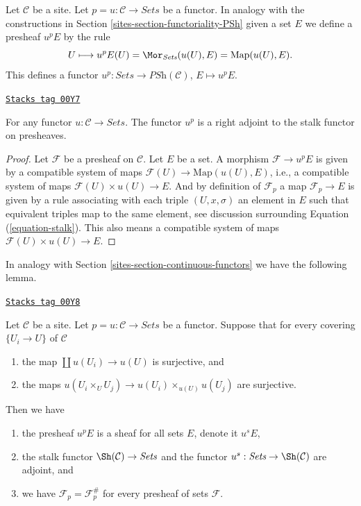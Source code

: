 Let $\mathcal{C}$ be a site. Let $p = u : \mathcal{C} \to \textit{Sets}$
be a functor. In analogy with the constructions in
Section \ref{sites-section-functoriality-PSh}
given a set $E$ we define a presheaf $u^pE$ by the rule
\begin{equation}
\label{equation-skyscraper}
U
\longmapsto
u^pE(U) = \Mor_{\textit{Sets}}(u(U), E) = \text{Map}(u(U), E).
\end{equation}
This defines a functor
$u^p : \textit{Sets} \to \textit{PSh}(\mathcal{C})$, $E \mapsto u^pE$.

\begin{lemma}
\label{sites-lemma-adjoint-point-push-stalk}
\href{https://stacks.math.columbia.edu/tag/00Y7}{\texttt{Stacks tag 00Y7}}

For any functor $u : \mathcal{C} \to \textit{Sets}$.
The functor $u^p$ is a right adjoint to the stalk functor
on presheaves.
\end{lemma}

\begin{proof}
Let $\mathcal{F}$ be a presheaf on $\mathcal{C}$.
Let $E$ be a set. A morphism $\mathcal{F} \to u^pE$
is given by a compatible system of maps
$\mathcal{F}(U) \to \text{Map}(u(U), E)$, i.e.,
a compatible system of maps $\mathcal{F}(U) \times u(U) \to E$.
And by definition of $\mathcal{F}_p$ a map $\mathcal{F}_p \to E$
is given by a rule associating with each triple $(U, x, \sigma)$
an element in $E$ such that equivalent triples map to the same element, see
discussion surrounding
Equation (\ref{equation-stalk}).
This also means a compatible system of maps $\mathcal{F}(U) \times u(U) \to E$.
\end{proof}

In analogy with Section \ref{sites-section-continuous-functors}
we have the following lemma.

\begin{lemma}
\label{sites-lemma-point-pushforward-sheaf}
\href{https://stacks.math.columbia.edu/tag/00Y8}{\texttt{Stacks tag 00Y8}}

Let $\mathcal{C}$ be a site. Let $p = u : \mathcal{C} \to \textit{Sets}$
be a functor. Suppose that for every covering $\{U_i \to U\}$ of $\mathcal{C}$
\begin{enumerate}
\item the map $\coprod u(U_i) \to u(U)$ is surjective, and
\item the maps
$u(U_i \times_U U_j) \to u(U_i) \times_{u(U)} u(U_j)$ are surjective.
\end{enumerate}
Then we have
\begin{enumerate}
\item the presheaf $u^pE$ is a sheaf for all sets $E$, denote it $u^sE$,
\item the stalk functor $\Sh(\mathcal{C}) \to \textit{Sets}$
and the functor $u^s: \textit{Sets} \to \Sh(\mathcal{C})$ are
adjoint, and
\item we have $\mathcal{F}_p = \mathcal{F}^\#_p$
for every presheaf of sets $\mathcal{F}$.
\end{enumerate}
\end{lemma}

